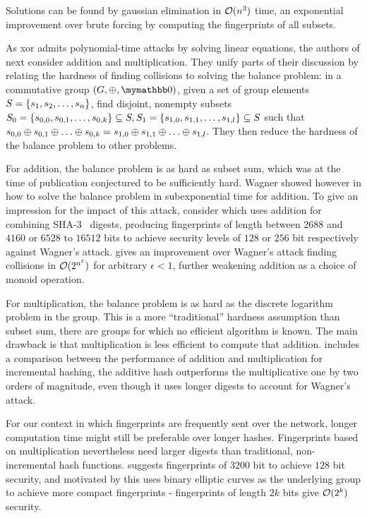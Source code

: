 Solutions can be found by gaussian elimination in $\mathcal{O}(n^3)$ time, an exponential improvement over brute forcing by computing the fingerprints of all subsets.

As xor admits polynomial-time attacks by solving linear equations, the authors of \cite{bellare1997new} next consider addition and multiplication. They unify parts of their discussion by relating the hardness of finding collisions to solving the balance problem: in a commutative group $(G, \groupaddsym, \neutraladd)$, given a set of group elements $S = \{s_1, s_2, \ldots, s_n\}$, find disjoint, nonempty subsets $S_0 = \{s_{0, 0}, s_{0, 1}, \ldots, s_{0, k}\} \subseteq S, S_1 = \{s_{1, 0}, s_{1, 1}, \ldots, s_{1, l}\} \subseteq S$ such that $s_{0, 0} \oplus s_{0, 1}  \oplus \ldots  \oplus s_{0, k} = s_{1, 0}  \oplus s_{1, 1}  \oplus \ldots  \oplus s_{1, l}$. They then reduce the hardness of the balance problem to other problems.

For addition, the balance problem is as hard as subset sum, which was at the time of publication conjectured to be sufficiently hard. Wagner showed however in \cite{wagner2002generalized} how to solve the balance problem in subexponential time for addition. To give an impression for the impact of this attack, consider \cite{mihajloska2015reviving} which uses addition for combining SHA-3~\cite{dworkin2015sha} digests, producing fingerprints of length between $2688$ and $4160$ or $6528$ to $16512$ bits to achieve security levels of $128$ or $256$ bit respectively against Wagner's attack. \cite{lyubashevsky2005parity} gives an improvement over Wagner's attack finding collisions in $\mathcal{O}(2^{n^\varepsilon})$ for arbitrary $\epsilon < 1$, further weakening addition as a choice of monoid operation.

For multiplication, the balance problem is as hard as the discrete logarithm problem in the group. This is a more ``traditional'' hardness assumption than subset sum, there are groups for which no efficient algorithm is known. The main drawback is that multiplication is less efficient to compute that addition. \cite{stanton2010fastad} includes a comparison between the performance of addition and multiplication for incremental hashing, the additive hash outperforms the multiplicative one by two orders of magnitude, even though it uses longer digests to account for Wagner's attack.

For our context in which fingerprints are frequently sent over the network, longer computation time might still be preferable over longer hashes. Fingerprints based on multiplication nevertheless need larger digests than traditional, non-incremental hash functions. \cite{maitin2017elliptic} suggests fingerprints of $3200$ bit to achieve $128$ bit security, and motivated by this uses binary elliptic curves as the underlying group to achieve more compact fingerprints - fingerprints of length $2k$ bits give $\mathcal{O}(2^k)$ security.

